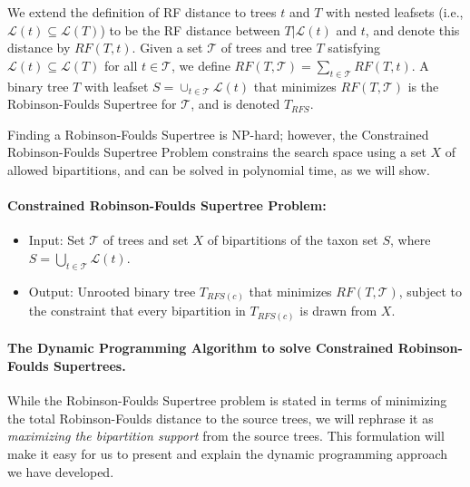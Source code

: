 We extend the
definition of RF distance to trees $t$ and $T$ with
nested leafsets (i.e., $\mathcal{L}(t) \subseteq  \mathcal{L}(T)$)
to be the RF distance between $T|\mathcal{L}(t)$ and $t$, and denote this distance by $RF(T,t)$.
Given a set $\mathcal{T}$ of trees
and tree $T$ satisfying $\mathcal{L}(t) \subseteq \mathcal{L}(T)$ for all $t \in \mathcal{T}$, we define
$RF(T,\mathcal{T}) = \sum_{t \in \mathcal{T}}RF(T,t).$
A binary tree $T$ with leafset $S = \cup_{t \in \mathcal{T}} \mathcal{L}(t)$ that 
minimizes $RF(T,\mathcal{T})$ is the Robinson-Foulds Supertree for $\mathcal{T}$, and is
denoted $T_{RFS}$. 

Finding a Robinson-Foulds Supertree is NP-hard; however,
the Constrained Robinson-Foulds Supertree Problem 
constrains the search space using a set $X$ of allowed bipartitions, 
and can be solved in polynomial time, as we will show.

\paragraph{Constrained Robinson-Foulds Supertree Problem: }


\begin{itemize}
\item Input: Set $\mathcal{T}$ of trees and set $X$ of
bipartitions of the taxon set $S$, where 
$S = \bigcup_{t \in \mathcal{T}} \mathcal{L}(t)$.
\item Output: Unrooted binary tree $T_{RFS(c)}$ that
minimizes $RF(T,\mathcal{T})$,  
subject to the constraint that every bipartition in $T_{RFS(c)}$
is drawn from  $X$.
\end{itemize}

\paragraph{\bf The Dynamic Programming Algorithm to solve Constrained Robinson-Foulds
Supertrees. }



While the Robinson-Foulds Supertree
problem is stated in terms of minimizing the total Robinson-Foulds
distance to the source trees, we will rephrase it
as {\em maximizing the  bipartition support} from the source
trees. 
This formulation will make it easy for us to present and explain
the dynamic programming approach we have developed.

